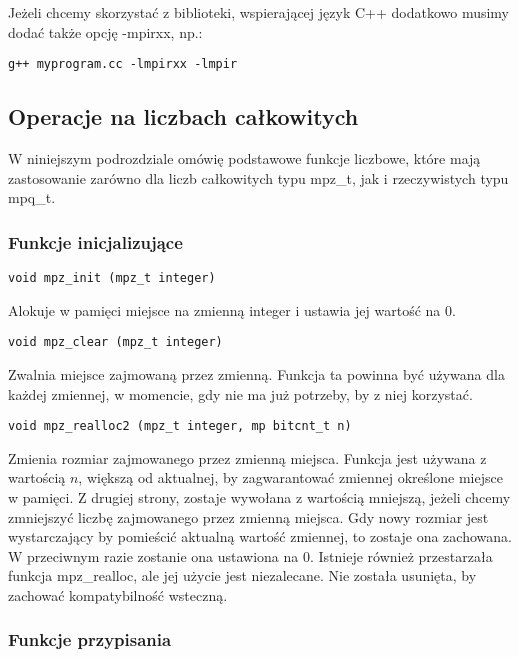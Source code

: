 \documentclass[twoside,a4paper]{book}
\begin{document}
Jeżeli chcemy skorzystać z biblioteki, wspierającej język C++ dodatkowo musimy dodać także opcję -mpirxx, np.:
\begin{lstlisting}
g++ myprogram.cc -lmpirxx -lmpir
\end{lstlisting}

\subsection{Operacje na liczbach całkowitych}
W niniejszym podrozdziale omówię podstawowe funkcje liczbowe, które mają zastosowanie zarówno dla liczb całkowitych typu mpz\_t, jak i rzeczywistych typu mpq\_t.

\subsubsection{Funkcje inicjalizujące}
\begin{lstlisting}
void mpz_init (mpz_t integer)
\end{lstlisting}

Alokuje w pamięci miejsce na zmienną integer i ustawia jej wartość na $0$.

\begin{lstlisting}
void mpz_clear (mpz_t integer)
\end{lstlisting}

Zwalnia miejsce zajmowaną przez zmienną. Funkcja ta powinna być używana dla każdej zmiennej, w momencie, gdy nie ma już potrzeby, by z niej korzystać.

\begin{lstlisting}
void mpz_realloc2 (mpz_t integer, mp bitcnt_t n)
\end{lstlisting}

Zmienia rozmiar zajmowanego przez zmienną miejsca. Funkcja jest używana z wartością $n$, większą od aktualnej, by zagwarantować zmiennej określone miejsce w pamięci. Z drugiej strony, zostaje wywołana z wartością mniejszą, jeżeli chcemy zmniejszyć liczbę zajmowanego przez zmienną miejsca. Gdy nowy rozmiar jest wystarczający by pomieścić aktualną wartość zmiennej, to zostaje ona zachowana. W przeciwnym razie zostanie ona ustawiona na $0$. Istnieje również przestarzała funkcja mpz\_realloc, ale jej użycie jest niezalecane. Nie została usunięta, by zachować kompatybilność wsteczną.

\subsubsection{Funkcje przypisania}
\end{document}
